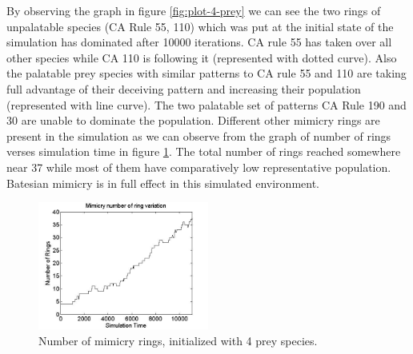 \documentclass[letterpaper]{article}
\numberwithin{equation}{section}
\begin{document}
By observing the graph in figure \ref{fig:plot-4-prey} we can see the two rings of unpalatable species (CA Rule 55, 110) which was put at the initial state of the simulation has dominated after 10000 iterations. CA rule 55 has taken over all other species while CA 110 is following it (represented with dotted curve). Also the palatable prey species with similar patterns to CA rule 55 and 110 are taking full advantage of their deceiving pattern and increasing their population (represented with line curve). The two palatable set of patterns CA Rule 190 and 30 are unable to dominate the population. Different other mimicry rings are present in the simulation as we can observe from the graph of number of rings verses simulation time in figure \ref{fig:ringSize10k-4Prey}. The total number of rings reached somewhere near 37 while most of them have comparatively low representative population. Batesian mimicry is in full effect in this simulated environment.

\begin{figure}[h]
	\centering
	\includegraphics[width=0.5\textwidth]{../tex/images/ringSize10k-4Prey}
	\caption[Number of mimicry rings (4 prey species)]{Number of mimicry rings, initialized with 4 prey species.}
	\label{fig:ringSize10k-4Prey}
\end{figure}
\end{document}
